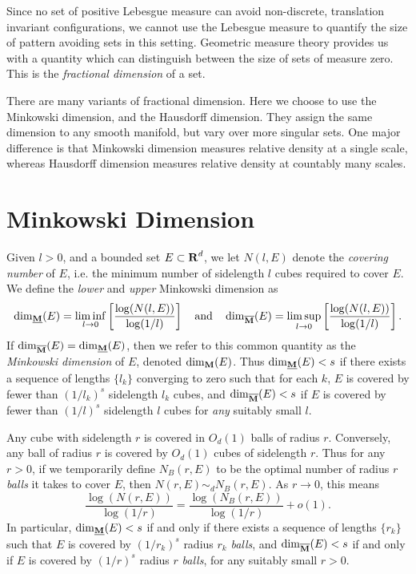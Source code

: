 
Since no set of positive Lebesgue measure can avoid non-discrete, translation invariant configurations, we cannot use the Lebesgue measure to quantify the size of pattern avoiding sets in this setting. Geometric measure theory provides us with a quantity which can distinguish between the size of sets of measure zero. This is the \emph{fractional dimension} of a set.

There are many variants of fractional dimension. Here we choose to use the Minkowski dimension, and the Hausdorff dimension. They assign the same dimension to any smooth manifold, but vary over more singular sets. One major difference is that Minkowski dimension measures relative density at a single scale, whereas Hausdorff dimension measures relative density at countably many scales.









\section{Minkowski Dimension}

Given $l > 0$, and a bounded set $E \subset \operatorname{\mathbf{R}}^d$, we let $N(l,E)$ denote the \emph{covering number} of $E$, i.e. the minimum number of sidelength $l$ cubes required to cover $E$. We define the \emph{lower} and \emph{upper} Minkowski dimension as
%
\[ \operatorname{\dim_{\underline{\mathbf{M}}}}(E) = \liminf_{l \to 0} \left[ \frac{\log(N(l,E))}{\log(1/l)} \right] \quad\text{and}\quad \operatorname{\dim_{\overline{\mathbf{M}}}}(E) = \limsup_{l \to 0} \left[ \frac{\log(N(l,E))}{\log(1/l)} \right]. \]
%
If $\operatorname{\dim_{\overline{\mathbf{M}}}}(E) = \operatorname{\dim_{\underline{\mathbf{M}}}}(E)$, then we refer to this common quantity as the \emph{Minkowski dimension} of $E$, denoted $\operatorname{\dim_{\mathbf{M}}}(E)$. Thus $\operatorname{\dim_{\underline{\mathbf{M}}}}(E) < s$ if there exists a sequence of lengths $\{ l_k \}$ converging to zero such that for each $k$, $E$ is covered by fewer than $(1/l_k)^s$ sidelength $l_k$ cubes, and $\operatorname{\dim_{\overline{\mathbf{M}}}}(E) < s$ if $E$ is covered by fewer than $(1/l)^s$ sidelength $l$ cubes for \emph{any} suitably small $l$.

\begin{remark}
	Any cube with sidelength $r$ is covered in $O_d(1)$ balls of radius $r$. Conversely, any ball of radius $r$ is covered by $O_d(1)$ cubes of sidelength $r$. Thus for any $r > 0$, if we temporarily define $N_B(r,E)$ to be the optimal number of radius $r$ \emph{balls} it takes to cover $E$, then $N(r,E) \sim_d N_B(r,E)$. As $r \to 0$, this means
	\[ \frac{\log(N(r,E))}{\log(1/r)} = \frac{\log(N_B(r,E))}{\log(1/r)} + o(1). \]
	In particular, $\operatorname{\dim_{\underline{\mathbf{M}}}}(E) < s$ if and only if there exists a sequence of lengths $\{ r_k \}$ such that $E$ is covered by $(1/r_k)^s$ radius $r_k$ \emph{balls}, and $\operatorname{\dim_{\overline{\mathbf{M}}}}(E) < s$ if and only if $E$ is covered by $(1/r)^s$ radius $r$ \emph{balls}, for any suitably small $r > 0$.
\end{remark}

